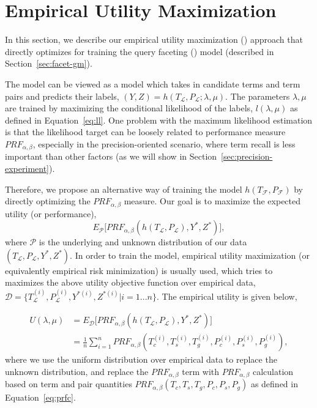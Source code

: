 
\section{Empirical Utility Maximization}
\label{sec:precision-eum}
In this section, we describe our empirical utility maximization (\EUM) approach that directly optimizes \PRF for training the query faceting (\QF) model (described in Section~\ref{sec:facet-gm}). 

The \QF model can be viewed as a model which takes in candidate terms and term pairs and predicts their labels, $(Y, Z)=h(T_\mathcal{L},P_\mathcal{L};\lambda,\mu)$. The parameters $\lambda,\mu$ are trained by maximizing the conditional likelihood of the labels, $l(\lambda,\mu)$ as defined in Equation~\ref{eq:ll}. One problem with the maximum likelihood estimation is that the likelihood target can be loosely related to performance measure $P\!R\!F_{\alpha,\beta}$, especially in the precision-oriented scenario, where term recall is less important than other factors (as we will show in Section~\ref{sec:precision-experiment}).

Therefore, we propose an alternative way of training the model $h(T_\mathcal{F},P_\mathcal{F})$ by directly optimizing the $P\!R\!F_{\alpha,\beta}$ measure. Our goal is to maximize the expected utility (or performance),
\begin{equation}
 E_\mathcal{P}\big[P\!R\!F_{\alpha,\beta}(h(T_\mathcal{L},P_\mathcal{L}),Y^*,Z^*)\big],
\end{equation}
where $\mathcal{P}$ is the underlying and unknown distribution of our data $(T_\mathcal{L},P_\mathcal{L},Y^*,Z^*)$. In order to train the model, empirical utility maximization (or equivalently empirical risk minimization) is usually used, which tries to maximizes the above utility objective function over empirical data,  $\mathcal{D}=\{T_{\mathcal{L}}^{(i)},P_{\mathcal{L}}^{(i)},Y^{*(i)},Z^{*(i)}|i=1...n\}$. The empirical utility is given below, 

\begin{equation}
\begin{split}
 U(\lambda,\mu) &= E_\mathcal{D}\big[P\!R\!F_{\alpha,\beta}(h(T_\mathcal{L},P_\mathcal{L}),Y^*,Z^*)\big] \\
 &=\frac{1}{n}\sum_{i=1}^{n}P\!R\!F_{\alpha,\beta}(T_c^{(i)},T_s^{(i)},T_g^{(i)},P_c^{(i)},P_s^{(i)},P_g^{(i)}),
\end{split}
\end{equation}
where we use the uniform distribution over empirical data to replace the unknown distribution, and replace the $P\!R\!F_{\alpha,\beta}$ term with $P\!R\!F_{\alpha,\beta}$ calculation based on term and pair quantities $P\!R\!F_{\alpha,\beta}(T_c,T_s,T_g,P_c,P_s,P_g)$ as defined in Equation~\ref{eq:prfc}. 

